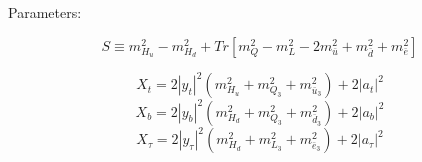 \begin{itemize}
\end{itemize}

Parameters:

\begin{equation}
S\equiv m^2_{H_u}-m^2_{H_d}+Tr[m^2_Q-m^2_L-2m^2_{\bar{u}}+m^2_{\bar{d}}+m^2_{\bar{e}}]
\end{equation}

\begin{equation}
X_t=2|y_t|^2(m^2_{H_u}+m^2_{Q_3}+m^2_{\bar{u}_3})+2|a_t|^2
\end{equation}
\begin{equation}
X_b=2|y_b|^2(m^2_{H_d}+m^2_{Q_3}+m^2_{\bar{d}_3})+2|a_b|^2
\end{equation}
\begin{equation}
X_{\tau}=2|y_{\tau}|^2(m^2_{H_d}+m^2_{L_3}+m^2_{\bar{e}_3})+2|a_{\tau}|^2
\end{equation}